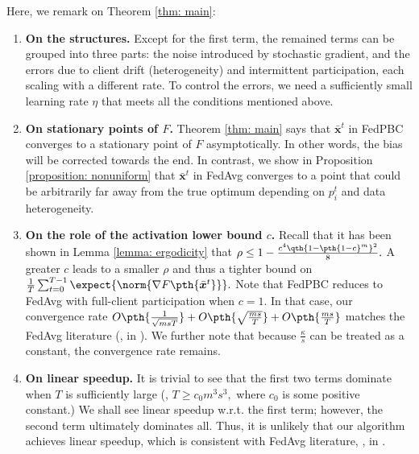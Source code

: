 \documentclass[letterpaper, 10 pt, conference]{ieeeconf}  %
\newcommand{\x}{{\bm x}}
\begin{document}
\begin{remark}
Here, we remark on Theorem \ref{thm: main}:
\begin{enumerate}
    \item {\bf On the structures.} 
    Except for the first term, the remained terms can be grouped into 
    three parts: the noise introduced by stochastic gradient, and the errors due to client drift (heterogeneity) and intermittent participation, each scaling with a different rate. 
    To control the errors, we need a sufficiently small learning rate $\eta$ that meets all the conditions mentioned above.
    \item {\bf On stationary points of $F$.} 
    Theorem \ref{thm: main} says that $\bar{\x}^t$ in {FedPBC} converges to a stationary point of $F$ asymptotically. 
    In other words, the bias will be corrected towards the end. 
    In contrast, we show in Proposition \ref{proposition: nonuniform} that $\bar{\x}^t$ in {FedAvg} converges to a point that could be arbitrarily far away from the true optimum depending on $p_i^t$ and data heterogeneity.
    \item {\bf On the role of the activation lower bound $c$.} Recall that it has been shown in Lemma \ref{lemma: ergodicity} that $\rho \le 1 - \frac{c^4\qth{1-\pth{1-c}^m}^2}{8}.$ A greater $c$ leads to a smaller $\rho$ and thus a tighter bound on $\frac{1}{T}\sum_{t=0}^{T-1} \expect{\norm{\nabla F \pth{\bar{\x}^t}}}.$ 
    Note that {FedPBC} reduces to {FedAvg} with full-client participation when $c=1$. In that case, our convergence rate $O\pth{\frac{1}{\sqrt{msT}}} + O\pth{\sqrt{\frac{ms}{T}}} + O\pth{\frac{ms}{T}}$ matches the {FedAvg} literature  (\eg, in \cite{wang2020tackling}). 
    We further note that because $\frac{\kappa}{s}$ can be treated as a constant, the convergence rate remains. 
    \item {\bf On linear speedup.} It is trivial to see that the first two terms dominate when $T$ is sufficiently large (\eg, $T\ge c_0 m^3 s^3,$ where $c_0$ is some positive constant.) We shall see linear speedup w.r.t. the first term; however, the second term ultimately dominates all. Thus, it is unlikely that our algorithm achieves linear speedup, which is consistent with {FedAvg} literature, \eg, in \cite{Li2020}.
\end{enumerate}
\end{remark}
\end{document}
